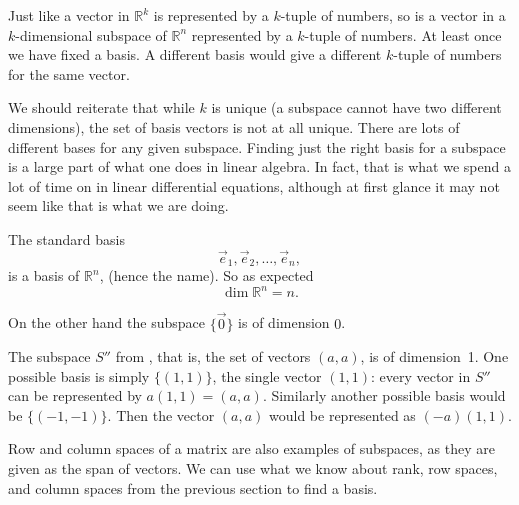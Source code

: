 Just like a vector in ${\mathbb R}^k$ is represented by a $k$-tuple of
numbers, so is a vector in a $k$-dimensional subspace of ${\mathbb R}^n$
represented by a $k$-tuple of numbers.  At least once we have fixed a basis.
A different basis would give a different $k$-tuple of numbers for the same
vector.

We should reiterate that while $k$ is unique (a subspace cannot have two different
dimensions), the set of basis vectors is not at all unique.  There are lots
of different bases for any given subspace.  Finding just the right basis for
a subspace is a large part of what one does in linear algebra.  In fact,
that is what we spend a lot of time on in
linear differential equations, although at first glance
it may not seem like that is what we are doing.

\begin{example}
The standard basis
\begin{equation*}
\vec{e}_1, \vec{e}_2, \ldots, \vec{e}_n ,
\end{equation*}
is a basis of ${\mathbb R}^n$, (hence the name).
So as expected
\begin{equation*}
\dim {\mathbb R}^n = n .
\end{equation*}

On the other hand the subspace $\{ \vec{0} \}$ is of dimension $0$.

The subspace $S''$ from , that is, the set of
vectors $(a,a)$, is of dimension~1.  One possible basis is simply
$\{ (1,1) \}$, the single
vector $(1,1)$: every vector in $S''$ can be represented by $a (1,1) =
(a,a)$.  Similarly another possible basis would be $\{ (-1,-1) \}$.  Then
the vector $(a,a)$ would be represented as $(-a) (1,1)$.
\end{example}

Row and column spaces of a matrix are also examples of
subspaces,
as they are given as the span of vectors.
We can use
what we know about rank, row spaces, and column spaces
from the previous section to find a basis.

